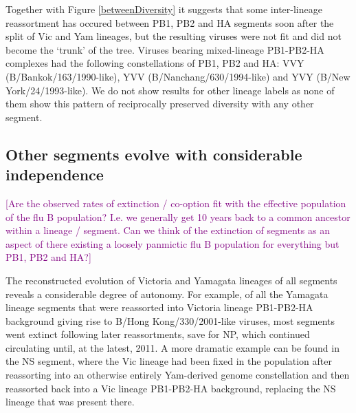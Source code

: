 \documentclass[11pt,oneside,letterpaper]{article}
\def\tbc#1{\textcolor{purple}{[#1]}}
\begin{document}
Together with Figure \ref{betweenDiversity} it suggests that some inter-lineage reassortment has occured between PB1, PB2 and HA segments soon after the split of Vic and Yam lineages, but the resulting viruses were not fit and did not become the `trunk' of the tree.
Viruses bearing mixed-lineage PB1-PB2-HA complexes had the following constellations of PB1, PB2 and HA: VVY (B/Bankok/163/1990-like), YVV (B/Nanchang/630/1994-like) and YVY (B/New York/24/1993-like).
We do not show results for other lineage labels as none of them show this pattern of reciprocally preserved diversity with any other segment.

\subsection*{Other segments evolve with considerable independence}

\tbc{Are the observed rates of extinction / co-option fit with the effective population of the flu B population?  I.e. we generally get 10 years back to a common ancestor within a lineage / segment.  Can we think of the extinction of segments as an aspect of there existing a loosely panmictic flu B population for everything but PB1, PB2 and HA?}

The reconstructed evolution of Victoria and Yamagata lineages of all segments reveals a considerable degree of autonomy.
For example, of all the Yamagata lineage segments that were reassorted into Victoria lineage PB1-PB2-HA background giving rise to B/Hong Kong/330/2001-like viruses, most segments went extinct following later reassortments, save for NP, which continued circulating until, at the latest, 2011.
A more dramatic example can be found in the NS segment, where the Vic lineage had been fixed in the population after reassorting into an otherwise entirely Yam-derived genome constellation and then reassorted back into a Vic lineage PB1-PB2-HA background, replacing the NS lineage that was present there. 
\end{document}
